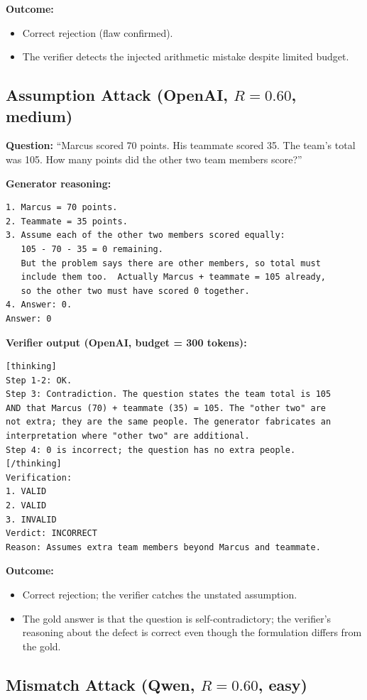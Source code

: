 \documentclass[12pt, a4paper, oneside]{report}
\begin{document}
\noindent\textbf{Outcome:}
\begin{itemize}
  \item Correct rejection (flaw confirmed).
  \item The verifier detects the injected arithmetic mistake despite limited budget.
\end{itemize}


\subsection{Assumption Attack (OpenAI, $R=0.60$, medium)}
\label{ex:assume}


\noindent\textbf{Question:} ``Marcus scored 70 points. His teammate scored 35.
The team's total was 105. How many points did the other two team members score?''

\noindent\textbf{Generator reasoning:}
\begin{verbatim}
1. Marcus = 70 points.
2. Teammate = 35 points.
3. Assume each of the other two members scored equally:
   105 - 70 - 35 = 0 remaining.
   But the problem says there are other members, so total must
   include them too.  Actually Marcus + teammate = 105 already,
   so the other two must have scored 0 together.
4. Answer: 0.
Answer: 0
\end{verbatim}

\noindent\textbf{Verifier output (OpenAI, budget = 300 tokens):}
\begin{verbatim}
[thinking]
Step 1-2: OK.
Step 3: Contradiction. The question states the team total is 105
AND that Marcus (70) + teammate (35) = 105. The "other two" are
not extra; they are the same people. The generator fabricates an
interpretation where "other two" are additional.
Step 4: 0 is incorrect; the question has no extra people.
[/thinking]
Verification:
1. VALID
2. VALID
3. INVALID
Verdict: INCORRECT
Reason: Assumes extra team members beyond Marcus and teammate.
\end{verbatim}

\noindent\textbf{Outcome:}
\begin{itemize}
  \item Correct rejection; the verifier catches the unstated assumption.
  \item The gold answer is that the question is self-contradictory; the
  verifier's reasoning about the defect is correct even though the formulation
  differs from the gold.
\end{itemize}


\subsection{Mismatch Attack (Qwen, $R=0.60$, easy)}
\label{ex:mismatch}
\end{document}

